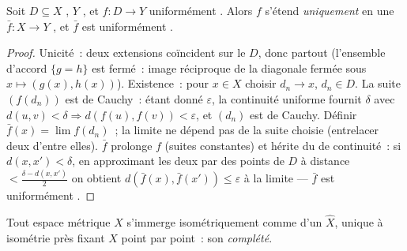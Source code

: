 \begin{theorem}
\label{thm:b3:complete:extension}
Soit $D \subseteq X$ , $Y$ , et $f \colon D \to
Y$ uniformément . Alors $f$ s'étend \emph{uniquement}
en une $\bar f \colon X \to Y$ , et $\bar f$ est
uniformément .
\end{theorem}

\begin{proof}
Unicité~: deux extensions  coïncident sur le 
$D$, donc partout (l'ensemble d'accord $\{g = h\}$ est fermé~:
image réciproque de la diagonale fermée sous $x\mapsto(g(x),
h(x))$).
Existence~: pour $x \in X$ choisir $d_n \to x$, $d_n \in D$.
La suite $(f(d_n))$ est de Cauchy~: étant donné $\varepsilon$,
la continuité uniforme fournit $\delta$ avec $d(u,v) < \delta
\Rightarrow d(f(u), f(v)) < \varepsilon$, et $(d_n)$ est de
Cauchy. Définir $\bar f(x) = \lim f(d_n)$~; la limite ne
dépend pas de la suite choisie (entrelacer deux d'entre elles).
$\bar f$ prolonge $f$ (suites constantes) et hérite du 
de continuité~: si $d(x, x') < \delta$, en approximant les
deux par des points de $D$ à distance $< \frac{\delta -
d(x,x')}2$ on obtient $d(\bar f(x), \bar f(x')) \leq
\varepsilon$ à la limite --- $\bar f$ est uniformément
.
\end{proof}

\begin{theorem}[Complété]\label{thm:b3:complete:completion}
Tout espace métrique $X$ s'immerge isométriquement comme
 d'un  $\hat X$, unique à
isométrie près fixant $X$ point par point~: son
\emph{complété}.
\end{theorem}

